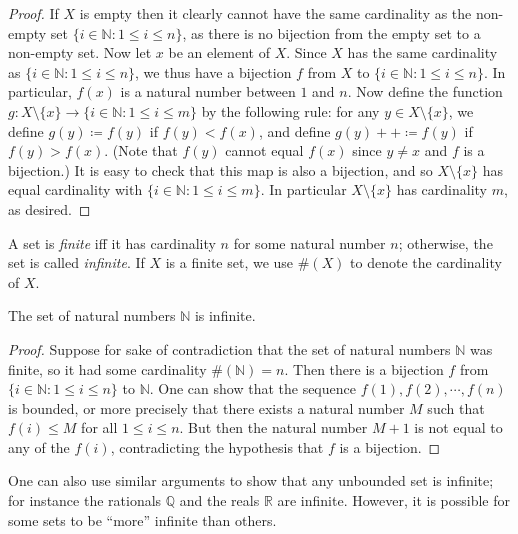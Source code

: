 \begin{proof}
If \(X\) is empty then it clearly cannot have the same cardinality as the non-empty set \(\{i \in \mathds{N} : 1 \leq i \leq n\}\), as there is no bijection from the empty set to a non-empty set.
Now let \(x\) be an element of \(X\).
Since \(X\) has the same cardinality as \(\{i \in \mathds{N} : 1 \leq i \leq n\}\), we thus have a bijection \(f\) from \(X\) to \(\{i \in \mathds{N} : 1 \leq i \leq n\}\).
In particular, \(f(x)\) is a natural number between \(1\) and \(n\).
Now define the function \(g : X \setminus \{x\} \to \{i \in \mathds{N} : 1 \leq i \leq m\}\) by the following rule: for any \(y \in X \setminus \{x\}\), we define \(g(y) \coloneqq f(y)\) if \(f(y) < f(x)\), and define \(g(y)++ \coloneqq f(y)\) if \(f(y) > f(x)\).
(Note that \(f(y)\) cannot equal \(f(x)\) since \(y \neq x\) and \(f\) is a bijection.)
It is easy to check that this map is also a bijection, and so \(X \setminus \{x\}\) has equal cardinality with \(\{i \in \mathds{N} : 1 \leq i \leq m\}\).
In particular \(X \setminus \{x\}\) has cardinality \(m\), as desired.
\end{proof}

\begin{definition}\label{3.6.10}
A set is \emph{finite} iff it has cardinality \(n\) for some natural number \(n\);
otherwise, the set is called \emph{infinite}.
If \(X\) is a finite set, we use \(\#(X)\) to denote the cardinality of \(X\).
\end{definition}

\setcounter{theorem}{11}
\begin{theorem}\label{3.6.12}
The set of natural numbers \(\mathds{N}\) is infinite.
\end{theorem}

\begin{proof}
Suppose for sake of contradiction that the set of natural numbers \(\mathds{N}\) was finite, so it had some cardinality \(\#(\mathds{N}) = n\).
Then there is a bijection \(f\) from \(\{i \in \mathds{N} : 1 \leq i \leq n\}\) to \(\mathds{N}\).
One can show that the sequence \(f(1), f(2), \cdots, f(n)\) is bounded, or more precisely that there exists a natural number \(M\) such that \(f(i) \leq M\) for all \(1 \leq i \leq n\).
But then the natural number \(M+1\) is not equal to any of the \(f(i)\), contradicting the hypothesis that \(f\) is a bijection.
\end{proof}

\begin{remark}\label{3.6.13}
One can also use similar arguments to show that any unbounded set is infinite;
for instance the rationals \(\mathds{Q}\) and the reals \(\mathds{R}\) are infinite.
However, it is possible for some sets to be ``more'' infinite than others.
\end{remark}

